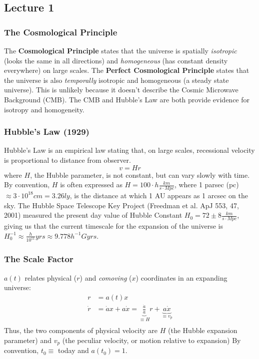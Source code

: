 \documentclass{article}
\def\aa{\frac{\dot a }{ a}}
\begin{document}
\subsection{Lecture 1}

\subsubsection{ The Cosmological Principle}

The {\bf Cosmological Principle} states that the universe is spatially 
{\it isotropic} (looks the same in all directions) 
and {\it homogeneous} (has constant density everywhere) on large scales.
The {\bf Perfect Cosmological Principle} states that the universe is
also {\it temporally} isotropic and homogeneous (a steady state universe). 
This is unlikely because it doesn't describe the Cosmic Microwave Background
(CMB).  The CMB and Hubble's Law are both provide evidence for isotropy and
homogeneity.

\subsubsection{ Hubble's Law (1929) }

Hubble's Law is an empirical law stating that, on large scales, recessional 
velocity is proportional to distance from observer.
$$\boxed{v=Hr}$$ 
where $H$, the Hubble parameter, is not constant, but can
vary slowly with time.  By convention, $H$ is often expressed as
$H=100\cdot h\frac{km}{ s\cdot Mpc}$, where 1 parsec (pc) $\approx3\cdot10^{18}cm
=3.26ly$, is the distance at which 1 AU appears as 1 arcsec on the sky.  
The Hubble Space Telescope Key Project (Freedman et al. ApJ 553, 47, 2001)
measured the present day value of Hubble Constant 
$H_0=72\pm 8\frac{km}{ s\cdot Mpc}$, giving us that the current timescale for
the expansion of the universe is 
$H_0^{-1}\approx\frac{h}{ 10^{11}}yrs\approx 9.778h^{-1}Gyrs$.

\subsubsection{ The Scale Factor }

$a(t)$ relates physical ($r$) and {\it comoving} ($x$) coordinates in an
expanding universe:
\begin{align}
r&=a(t)x\\
\dot r&=\dot ax+a\dot x=\underbrace{\aa}_{\equiv H}r+\underbrace{a\dot x}_{\equiv v_p}\\
\end{align}
Thus, the two components of physical velocity are $H$ (the Hubble expansion 
parameter) and $v_p$ (the peculiar velocity, or motion relative to expansion)
By convention, $t_0 \equiv$ today and $a(t_0)=1$.
\end{document}
